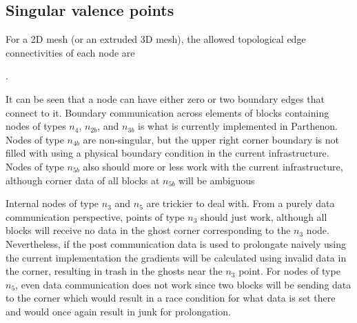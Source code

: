 \documentclass{article}
\begin{document}
\subsection{Singular valence points}
For a 2D mesh (or an extruded 3D mesh), the allowed topological edge connectivities of each node are 
\begin{center}
.
\end{center}
It can be seen that a node can have either zero or two boundary edges that connect to it. Boundary communication across elements of blocks containing nodes of types $n_4$, $n_{2b}$, and $n_{3b}$ is what is currently implemented in Parthenon. Nodes of type $n_{4b}$ are non-singular, but the upper right corner boundary is not filled with using a physical boundary condition in the current infrastructure. Nodes of type $n_{5b}$ also should more or less work with the current infrastructure, although corner data of all blocks at $n_{5b}$ will be ambiguous 

Internal nodes of type $n_3$ and $n_5$ are trickier to deal with. From a purely data communication perspective, points of type $n_3$ should just work, although all blocks will receive no data in the ghost corner corresponding to the $n_3$ node. Nevertheless, if the post communication data is used to prolongate naively using the current implementation the gradients will be calculated using invalid data in the corner, resulting in trash in the ghosts near the $n_3$ point. For nodes of type $n_5$, even data communication does not work since two blocks will be sending data to the corner which would result in a race condition for what data is set there and would once again result in junk for prolongation.  
\end{document}
